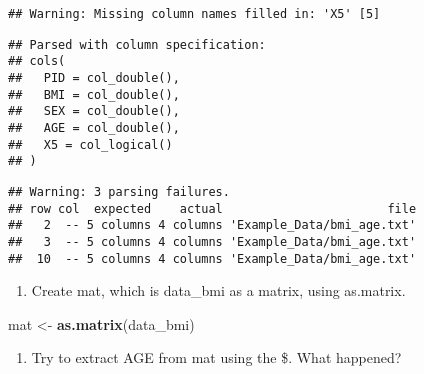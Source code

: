 \documentclass[]{article}
\newenvironment{Shaded}{\begin{snugshade}}{\end{snugshade}}
\newcommand{\CommentTok}[1]{\textcolor[rgb]{0.56,0.35,0.01}{\textit{#1}}}
\newcommand{\KeywordTok}[1]{\textcolor[rgb]{0.13,0.29,0.53}{\textbf{#1}}}
\newcommand{\NormalTok}[1]{#1}
\newcommand{\OperatorTok}[1]{\textcolor[rgb]{0.81,0.36,0.00}{\textbf{#1}}}
\newcommand{\OtherTok}[1]{\textcolor[rgb]{0.56,0.35,0.01}{#1}}
\newcommand{\StringTok}[1]{\textcolor[rgb]{0.31,0.60,0.02}{#1}}
\providecommand{\tightlist}{%
  \setlength{\itemsep}{0pt}\setlength{\parskip}{0pt}}
\begin{document}
\begin{verbatim}
## Warning: Missing column names filled in: 'X5' [5]
\end{verbatim}

\begin{verbatim}
## Parsed with column specification:
## cols(
##   PID = col_double(),
##   BMI = col_double(),
##   SEX = col_double(),
##   AGE = col_double(),
##   X5 = col_logical()
## )
\end{verbatim}

\begin{verbatim}
## Warning: 3 parsing failures.
## row col  expected    actual                       file
##   2  -- 5 columns 4 columns 'Example_Data/bmi_age.txt'
##   3  -- 5 columns 4 columns 'Example_Data/bmi_age.txt'
##  10  -- 5 columns 4 columns 'Example_Data/bmi_age.txt'
\end{verbatim}

\begin{Shaded}
\end{Shaded}

\begin{enumerate}
\def\labelenumi{\alph{enumi}.}
\setcounter{enumi}{1}
\tightlist
\item
  Create mat, which is data\_bmi as a matrix, using as.matrix.
\end{enumerate}

\begin{Shaded}
\begin{Highlighting}[]
\NormalTok{mat <-}\StringTok{ }\KeywordTok{as.matrix}\NormalTok{(data_bmi)}
\end{Highlighting}
\end{Shaded}

\begin{enumerate}
\def\labelenumi{\alph{enumi}.}
\setcounter{enumi}{2}
\tightlist
\item
  Try to extract AGE from mat using the \$. What happened?
\end{enumerate}

\begin{Shaded}
\end{Shaded}
\end{document}
